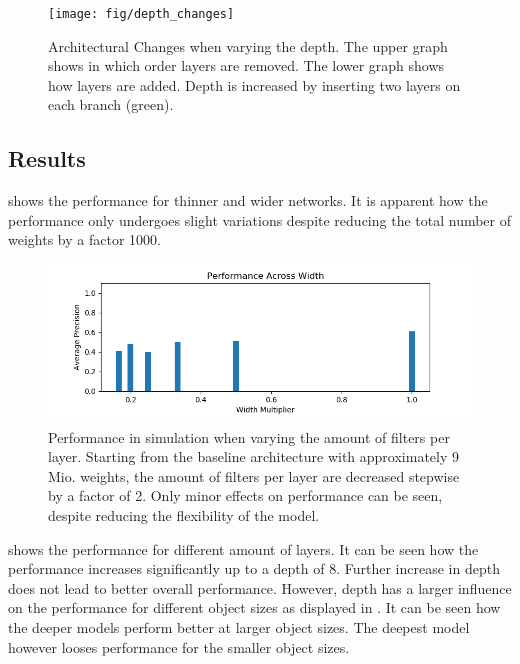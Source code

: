 		\begin{figure}[hbtp]
			\centering
			\texttt{[image: fig/depth\_changes]}
			\caption{Architectural Changes when varying the depth. The upper graph shows in which order layers are removed. The lower graph shows how layers are added. Depth is increased by inserting two layers on each branch (green). }
			\label{fig:depth_changes}
		\end{figure}
	
	\subsection{Results}
	
	 shows the performance for thinner and wider networks. It is apparent how the performance only undergoes slight variations despite reducing the total number of weights by a factor 1000. 
	
	
	\begin{figure}[hbtp]
		\centering
		\includegraphics[width=\textwidth]{fig/perf_width}
		\caption{Performance in simulation when varying the amount of filters per layer. Starting from the baseline architecture with approximately 9 Mio. weights, the amount of filters per layer are decreased stepwise by a factor of 2. Only minor effects on performance can be seen, despite reducing the flexibility of the model.}
		\label{fig:perf_width}
	\end{figure}
	
	 shows the performance for different amount of layers. It can be seen how the performance increases significantly up to a depth of 8. Further increase in depth does not lead to better overall performance. However, depth has a larger influence on the performance for different object sizes as displayed in . It can be seen how the deeper models perform better at larger object sizes. The deepest model however looses performance for the smaller object sizes.

